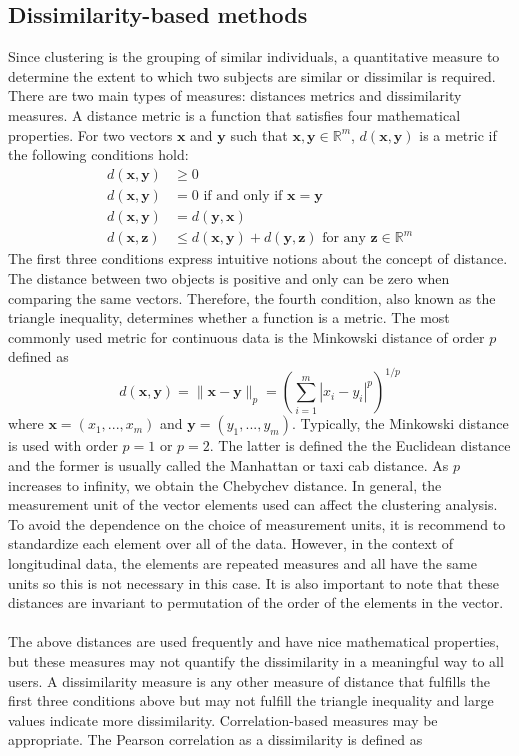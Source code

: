\documentclass[12pt]{article}
\newcommand{\B}[0]{\mathbf}
\begin{document}
\subsection{Dissimilarity-based methods}
Since clustering is the grouping of similar individuals, a quantitative measure to determine the extent to which two subjects are similar or dissimilar is required.  There are two main types of measures: distances metrics and dissimilarity measures. A distance metric is a function that satisfies four mathematical properties. For two vectors $\B x$ and $\B y$ such that $\B x,\B y\in\mathbb{R}^{m}$, $d(\B x,\B y)$ is a metric if the following conditions hold:
\begin{align*}
d(\B x,\B y)&\geq 0 \\
d(\B x,\B y) &= 0\text{ if and only if } \B x=\B y\\
d(\B x,\B y) &= d(\B y,\B x)\\
d(\B x,\B z) &\leq d(\B x,\B y) + d(\B y,\B z)\text{ for any }\B z\in \mathbb{R}^{m}
\end{align*}
The first three conditions express intuitive notions about the concept of distance. The distance between two objects is positive and only can be zero when comparing the same vectors. Therefore, the fourth condition, also known as the triangle inequality, determines whether a function is a metric. The most commonly used metric for continuous data is the Minkowski distance of order $p$ defined as
$$d(\B x,\B y) = \|\B x - \B y\|_{p} = \left(\sum^{m}_{i=1}|x_{i}-y_{i}|^{p}\right)^{1/p}$$
where $\B x = (x_{1},...,x_{m})$ and $\B y = (y_{1},...,y_{m})$. Typically, the Minkowski distance is used with order $p=1$ or $p=2$. The latter is defined the the Euclidean distance and the former is usually called the Manhattan or taxi cab distance. As $p$ increases to infinity, we obtain the Chebychev distance. In general, the measurement unit of the vector elements used can affect the clustering analysis. To avoid the dependence on the choice of measurement units, it is recommend to standardize each element over all of the data. However, in the context of longitudinal data, the elements are repeated measures and all have the same units so this is not necessary in this case. It is also important to note that these distances are invariant to permutation of the order of the elements in the vector.\\\\
The above distances are used frequently and have nice mathematical properties, but these measures may not quantify the dissimilarity in a meaningful way to all users. A dissimilarity measure is any other measure of distance that fulfills the first three conditions above but may not fulfill the triangle inequality and large values indicate more dissimilarity. Correlation-based measures may be appropriate. The Pearson correlation as a dissimilarity is defined as
\end{document}
